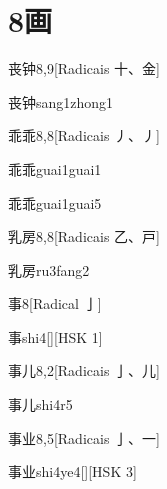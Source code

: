 
\section*{8画}

\begin{entry}{丧钟}{8,9}[Radicais ⼗、⾦]
  \begin{phonetics}{丧钟}{sang1zhong1}
  \end{phonetics}
\end{entry}

\begin{entry}{乖乖}{8,8}[Radicais ⼃、⼃]
  \begin{phonetics}{乖乖}{guai1guai1}
  \end{phonetics}
  \begin{phonetics}{乖乖}{guai1guai5}
  \end{phonetics}
\end{entry}

\begin{entry}{乳房}{8,8}[Radicais ⼄、⼾]
  \begin{phonetics}{乳房}{ru3fang2}
  \end{phonetics}
\end{entry}

\begin{entry}{事}{8}[Radical ⼅]
  \begin{phonetics}{事}{shi4}[][HSK 1]
  \end{phonetics}
\end{entry}

\begin{entry}{事儿}{8,2}[Radicais ⼅、⼉]
  \begin{phonetics}{事儿}{shi4r5}
  \end{phonetics}
\end{entry}

\begin{entry}{事业}{8,5}[Radicais ⼅、⼀]
  \begin{phonetics}{事业}{shi4ye4}[][HSK 3]
  \end{phonetics}
\end{entry}


